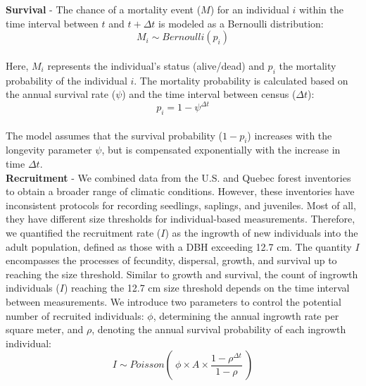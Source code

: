 \textbf{Survival} - The chance of a mortality event (\(M\)) for an
individual \(i\) within the time interval between \(t\) and
\(t+\Delta t\) is modeled as a Bernoulli distribution:\\

\begin{equation}
M_i \sim Bernoulli(p_i)
\label{eq:survL}\end{equation}\\

Here, \(M_i\) represents the individual's status (alive/dead) and
\(p_i\) the mortality probability of the individual \(i\). The mortality
probability is calculated based on the annual survival rate (\(\psi\))
and the time interval between census (\(\Delta t\)):\\

\begin{equation}
p_i = 1 - \psi^{\Delta t}
\label{eq:survP}\end{equation}\\

The model assumes that the survival probability (\(1 - p_i\)) increases
with the longevity parameter \(\psi\), but is compensated exponentially
with the increase in time \(\Delta t\).\\

\textbf{Recruitment} - We combined data from the U.S. and Quebec forest
inventories to obtain a broader range of climatic conditions. However,
these inventories have inconsistent protocols for recording seedlings,
saplings, and juveniles. Most of all, they have different size
thresholds for individual-based measurements. Therefore, we quantified
the recruitment rate (\(I\)) as the ingrowth of new individuals into the
adult population, defined as those with a DBH exceeding 12.7 cm. The
quantity \(I\) encompasses the processes of fecundity, dispersal,
growth, and survival up to reaching the size threshold. Similar to
growth and survival, the count of ingrowth individuals (\(I\)) reaching
the 12.7 cm size threshold depends on the time interval between
measurements. We introduce two parameters to control the potential
number of recruited individuals: \(\phi\), determining the annual
ingrowth rate per square meter, and \(\rho\), denoting the annual
survival probability of each ingrowth individual:\\

\begin{equation}
  I \sim Poisson(~\phi \times A \times \frac{1 - \rho^{\Delta t}}{1-\rho}~)
\label{eq:rec}\end{equation}\\

